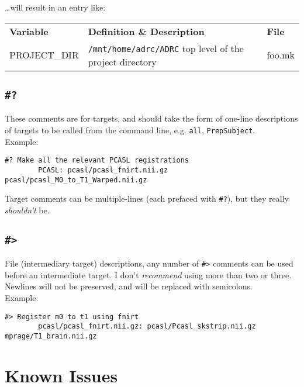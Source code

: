 \documentclass[oneside,11pt]{article}
\begin{document}
	\ldots will result in an entry like: \\
	
	\begin{tabularx}{\textwidth}{>{\ttfamily}l X >{\ttfamily}l}
		\rowcolor{gray!50}
		\textbf{Variable} & \textbf{Definition \& Description} & \textbf{File} \\
		PROJECT\_DIR	& \texttt{/mnt/home/adrc/ADRC} \newline top level of the project directory & foo.mk \\
		\bottomrule
	\end{tabularx}
	
	\subsection{\texttt{\#?}}
	
	These comments are for targets, and should take the form of one-line descriptions of targets to be called from the command line, e.g. \texttt{all}, \texttt{PrepSubject}. \\
	Example:
	\begin{lstlisting}[basicstyle=\ttfamily,gobble=16, breaklines=true]
		#? Make all the relevant PCASL registrations
		PCASL: pcasl/pcasl_fnirt.nii.gz pcasl/pcasl_M0_to_T1_Warped.nii.gz	
	\end{lstlisting} 
	
	Target comments can be multiple-lines (each prefaced with \texttt{\#?}), but they really \textit{shouldn't} be.
	
	\subsection{\texttt{\#>}}

	File (intermediary target) descriptions, any number of \texttt{\#>} comments can be used before an intermediate target. I don't \textit{recommend} using more than two or three. Newlines will not be preserved, and will be replaced with semicolons. \\ 
	Example: 
	\begin{lstlisting}[basicstyle=\ttfamily,gobble=16,breaklines=true]
		#> Register m0 to t1 using fnirt
		pcasl/pcasl_fnirt.nii.gz: pcasl/Pcasl_skstrip.nii.gz mprage/T1_brain.nii.gz
	\end{lstlisting}
	
	\section{Known Issues}
	
\end{document}
